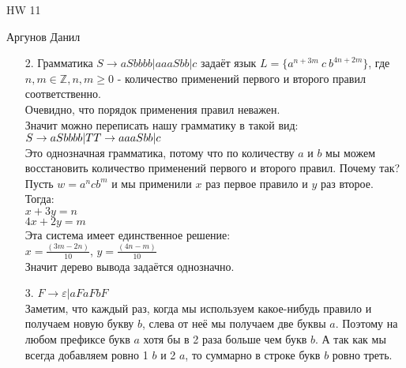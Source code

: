 \documentclass[12pt]{article}
\begin{document}
	\begin{center} {\LARGE HW 11} \end{center}
	\begin{center} {Аргунов Данил} \end{center}
	
	\bigskip

\begin{enumerate}
 \item [2.] Грамматика $S \rightarrow aSbbbb | aaaSbb | c$ задаёт язык $L = \{ a^{n + 3m} \ c \ b^{4n + 2m} \}$, где $n, m \in \mathbb{Z}, n,m \geqslant 0$ - количество применений первого и второго правил соответственно. \\
 Очевидно, что порядок применения правил неважен.\\
 Значит можно переписать нашу грамматику в такой вид: \\
 $S \rightarrow aSbbbb|T \\
 T \rightarrow aaaSbb|c$ \\
 Это однозначная грамматика, потому что по количеству $a$ и $b$ мы можем восстановить количество применений первого и второго правил. Почему так? \\
 Пусть $w = a^{n}cb^{m}$ и мы применили $x$ раз первое правило и $y$ раз второе. \\
 Тогда:\\
 $x + 3y = n$\\
 $4x + 2y = m$ \\
 Эта система имеет единственное решение: \\
 $x = \frac{(3m - 2n)}{10}$, $y = \frac{(4n - m)}{10}$ \\
 Значит дерево вывода задаётся однозначно.
 
 \item [3.] $F \rightarrow \varepsilon | aFaFbF$ \\
 Заметим, что каждый раз, когда мы используем какое-нибудь правило и получаем новую букву $b$, слева от неё мы получаем две буквы $a$. Поэтому на любом префиксе букв $a$ хотя бы в 2 раза больше чем букв $b$. А так как мы всегда добавляем ровно 1 $b$ и 2 $a$, то суммарно в строке букв $b$ ровно треть.
  

\end{enumerate}
\end{document}
